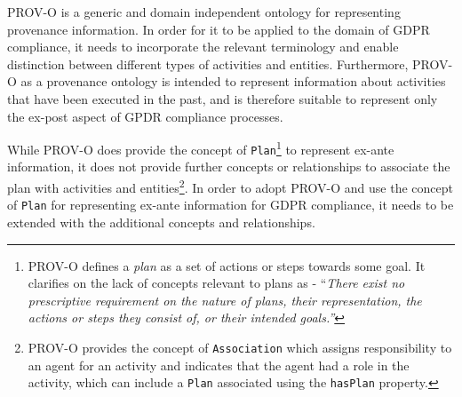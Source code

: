 PROV-O is a generic and domain independent ontology for representing provenance information.
In order for it to be applied to the domain of GDPR compliance, it needs to incorporate the relevant terminology and enable distinction between different types of activities and entities.
Furthermore, PROV-O as a provenance ontology is intended to represent information about activities that have been executed in the past, and is therefore suitable to represent only the ex-post aspect of GPDR compliance processes.

While PROV-O does provide the concept of \texttt{Plan}\footnote{PROV-O defines a \textit{plan} as a set of actions or steps towards some goal. It clarifies on the lack of concepts relevant to plans as - ``\textit{There exist no prescriptive requirement on the nature of plans, their representation, the actions or steps they consist of, or their intended goals.''}} to represent ex-ante information, it does not provide further concepts or relationships to associate the plan with activities and entities\footnote{PROV-O provides the concept of \texttt{Association} which assigns responsibility to an agent for an activity and indicates that the agent had a role in the activity, which can include a \texttt{Plan} associated using the \texttt{hasPlan} property.}.
In order to adopt PROV-O and use the concept of \texttt{Plan} for representing ex-ante information for GDPR compliance, it needs to be extended with the additional concepts and relationships.

